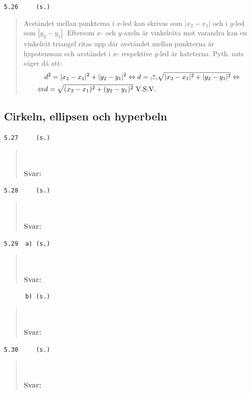 \documentclass[a4paper]{article}
\newcommand{\tskcol}[1]{\textcolor{tskcol}{#1}}
\newcommand\varpm{\mathbin{\vcenter{\hbox{%
				\oalign{\hfil$\scriptstyle+$\hfil\cr
					\noalign{\kern-.5ex}					
					$\scriptscriptstyle({-})$\cr}%
			}}}}
\begin{document}
	\texttt{\tskcol{5.26~~~~ (s.)}}
	\begin{quotation}
		\noindent
		Avståndet mellan punkterna i $x$-led kan skrivas som $|x_2-x_1|$ och i $y$-led som $|y_2-y_1|$. Eftersom $x$- och $y$-axeln är vinkelräta mot varandra kan en vinkelrät triangel ritas upp där avståndet mellan punkterna är hypotenusan och avståndet i $x$- respektive $y$-led är kateterna. Pyth. sats säger då att: 
		\begin{align*}
		&d^2=|x_2-x_1|^2+|y_2-y_1|^2 \Leftrightarrow
		d=\varpm\sqrt{|x_2-x_1|^2+|y_2-y_1|^2} \Leftrightarrow \\ \Leftrightarrow
		&d=\sqrt{(x_2-x_1)^2+(y_2-y_1)^2} \text{ V.S.V.}
		\end{align*}
	\end{quotation}
	
	\subsection*{Cirkeln, ellipsen och hyperbeln}
	
	\texttt{\tskcol{5.27~~~~ (s.)}}
	\begin{quotation}
		\noindent
		\\ \\
		\textbf{Svar:}
	\end{quotation}
	
	\texttt{\tskcol{5.28~~~~ (s.)}}
	\begin{quotation}
		\noindent
		\\ \\
		\textbf{Svar:}
	\end{quotation}
	
	\texttt{\tskcol{5.29~~a) (s.)}}
	\begin{quotation}
		\noindent
		\\ \\
		\textbf{Svar:}
	\end{quotation}
	
	\texttt{\tskcol{~~~~~~b) (s.)}}
	\begin{quotation}
		\noindent
		\\ \\
		\textbf{Svar:}
	\end{quotation}
	
	\texttt{\tskcol{5.30~~~~ (s.)}}
	\begin{quotation}
		\noindent
		\\ \\
		\textbf{Svar:}
	\end{quotation}
	
\end{document}
